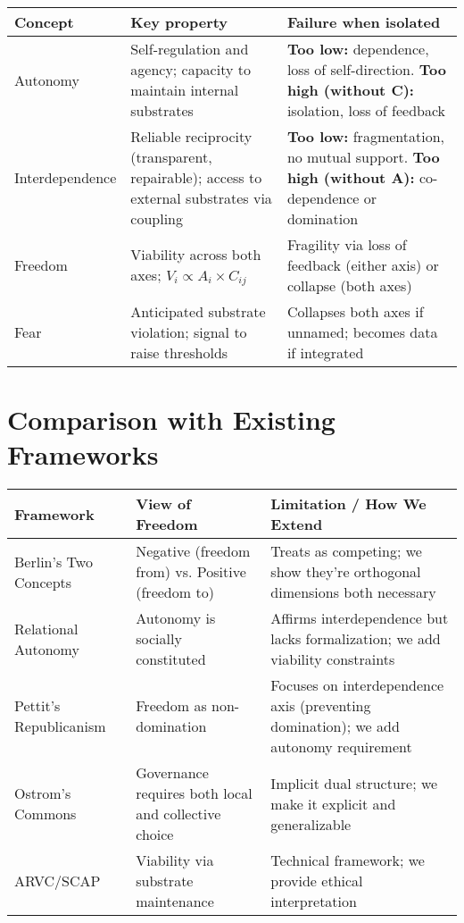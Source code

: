 \documentclass[11pt,a4paper]{article}
\begin{document}
\begin{center}
\begin{tabular}{|l|p{5.5cm}|p{6cm}|}
\hline
\textbf{Concept} & \textbf{Key property} & \textbf{Failure when isolated} \\ \hline
Autonomy & Self-regulation and agency; capacity to maintain internal substrates & \textbf{Too low:} dependence, loss of self-direction. \textbf{Too high (without C):} isolation, loss of feedback \\ \hline
Interdependence & Reliable reciprocity (transparent, repairable); access to external substrates via coupling & \textbf{Too low:} fragmentation, no mutual support. \textbf{Too high (without A):} co-dependence or domination \\ \hline
Freedom & Viability across both axes; $V_i \propto A_i \times C_{ij}$ & Fragility via loss of feedback (either axis) or collapse (both axes) \\ \hline
Fear & Anticipated substrate violation; signal to raise thresholds & Collapses both axes if unnamed; becomes data if integrated \\ \hline
\end{tabular}
\end{center}

\section{Comparison with Existing Frameworks}

\begin{center}
\small
\begin{tabular}{|l|p{4cm}|p{7cm}|}
\hline
\textbf{Framework} & \textbf{View of Freedom} & \textbf{Limitation / How We Extend} \\ \hline
Berlin's Two Concepts~\cite{berlin} & Negative (freedom from) vs. Positive (freedom to) & Treats as competing; we show they're orthogonal dimensions both necessary \\ \hline
Relational Autonomy~\cite{mackenzie} & Autonomy is socially constituted & Affirms interdependence but lacks formalization; we add viability constraints \\ \hline
Pettit's Republicanism~\cite{pettit} & Freedom as non-domination & Focuses on interdependence axis (preventing domination); we add autonomy requirement \\ \hline
Ostrom's Commons~\cite{ostrom} & Governance requires both local and collective choice & Implicit dual structure; we make it explicit and generalizable \\ \hline
ARVC/SCAP~\cite{arvc,scap} & Viability via substrate maintenance & Technical framework; we provide ethical interpretation \\ \hline
\end{tabular}
\end{center}
\end{document}
